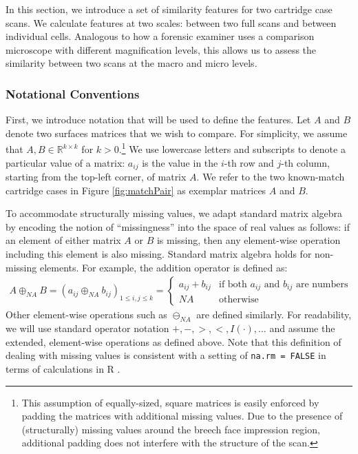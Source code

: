 \documentclass[11pt,]{isuthesis}
\let\rmarkdownfootnote\footnote%
\def\footnote{\protect\rmarkdownfootnote}
\begin{document}
In this section, we introduce a set of similarity features for two cartridge case scans.
We calculate features at two scales: between two full scans and between individual cells.
Analogous to how a forensic examiner uses a comparison microscope with different magnification levels, this allows us to assess the similarity between two scans at the macro and micro levels.

\hypertarget{notational-conventions-1}{%
\subsubsection{Notational Conventions}\label{notational-conventions-1}}

First, we introduce notation that will be used to define the features.
Let \(A\) and \(B\) denote two surfaces matrices that we wish to compare.
For simplicity, we assume that \(A,B \in \mathbb{R}^{k \times k}\) for \(k > 0\).\footnote{This assumption of equally-sized, square matrices is easily enforced by padding the matrices with additional missing values.
Due to the presence of (structurally) missing values around the breech face impression region, additional padding does not interfere with the structure of the scan.}
We use lowercase letters and subscripts to denote a particular value of a matrix: \(a_{ij}\) is the value in the \(i\)-th row and \(j\)-th column, starting from the top-left corner, of matrix \(A\).
We refer to the two known-match cartridge cases in Figure \ref{fig:matchPair} as exemplar matrices \(A\) and \(B\).

To accommodate structurally missing values, we adapt standard matrix algebra by encoding the notion of ``missingness'' into the space of real values as follows: if an element of either matrix \(A\) or \(B\) is missing, then any element-wise operation including this element is also missing.
Standard matrix algebra holds for non-missing elements.
For example, the addition operator is defined as:
\begin{align*}
A \oplus_{NA} B = (a_{ij} \oplus_{NA} b_{ij})_{1 \leq i,j \leq k} = 
\begin{cases}
a_{ij} + b_{ij} & \text{if both $a_{ij}$ and $b_{ij}$ are numbers} \\
NA &\text{otherwise}
\end{cases}
\end{align*}
Other element-wise operations such as \(\ominus_{NA}\) are defined similarly.
For readability, we will use standard operator notation \(+, -, >, <, I(\cdot), ...\) and assume the extended, element-wise operations as defined above.
Note that this definition of dealing with missing values is consistent with a setting of \texttt{na.rm\ =\ FALSE} in terms of calculations in R \citep{Rlanguage}.
\end{document}
